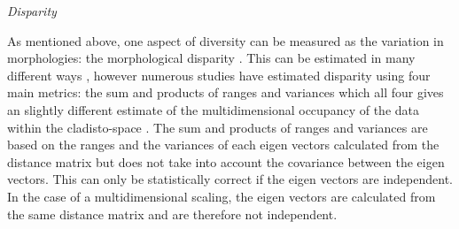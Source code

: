 \documentclass[12pt,letterpaper]{article}
\renewcommand{\subsection}[1]{%
\bigskip
\begin{center}
\begin{large}
\normalfont\itshape #1
\end{large}
\end{center}}
\begin{document}
\subsection{Disparity}
As mentioned above, one aspect of diversity can be measured as the variation in morphologies: the morphological disparity \citep[e.g.][]{Wesley-Hunt2005,Brusatte12092008,toljagictriassic-jurassic2013}.
This can be estimated in many different ways \citep[e.g.][]{Ciampaglio2004,thorneresetting2011,hopkinsdecoupling2013,huang2015origins}, however numerous studies have estimated disparity using four main metrics: the sum and products of ranges and variances which all four gives an slightly different estimate of the multidimensional occupancy of the data within the cladisto-space \citep{Foote01071994,Wills1994,brusatte50,Brusatte12092008,cisneros2010,thorneresetting2011,prentice2011,brusattedinosaur2012,toljagictriassic-jurassic2013,ruta2013,bentonmodels2014,bensonfaunal2014}.
The sum and products of ranges and variances are based on the ranges and the variances of each eigen vectors calculated from the distance matrix but does not take into account the covariance between the eigen vectors.
This can only be statistically correct if the eigen vectors are independent.
In the case of a multidimensional scaling, the eigen vectors are calculated from the same distance matrix and are therefore not independent.
\end{document}
